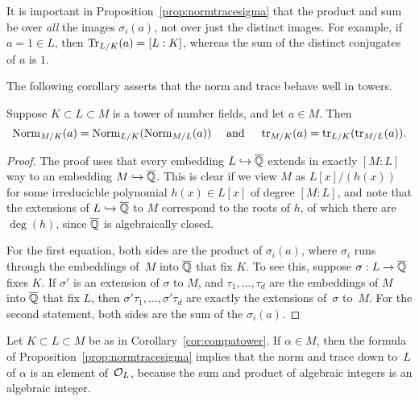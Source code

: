 It is important in Proposition~\ref{prop:normtracesigma} that
the product and sum be over {\em all} the images $\sigma_i(a)$,
not over just the distinct images.  For example, if $a=1\in L$, then
$\operatorname{Tr}_{L/K}(a) = [L:K]$, whereas the sum of the distinct conjugates
of $a$ is $1$.

The following corollary asserts that the norm and trace behave well in
towers.
\begin{corollary}\label{cor:compatower}
Suppose $K\subset L \subset M$ is a tower of number fields, and
let $a\in M$.  Then 
$$
\operatorname{Norm}_{M/K}(a) = \operatorname{Norm}_{L/K}(\operatorname{Norm}_{M/L}(a))
\quad\text{ and }\quad
\operatorname{tr}_{M/K}(a) = \operatorname{tr}_{L/K}(\operatorname{tr}_{M/L}(a)).
$$
\end{corollary}
\begin{proof}
The proof uses that every embedding $L\hookrightarrow \overline{\mathbb{Q}}$ extends in exactly
$[M:L]$ way to an embedding $M\hookrightarrow \overline{\mathbb{Q}}$.  This is clear
if we view $M$ as $L[x]/(h(x))$ for some irreducicble
polynomial $h(x) \in L[x]$ of degree $[M:L]$, and note that 
the extensions of $L\hookrightarrow \overline{\mathbb{Q}}$ to $M$ correspond to
the roots of $h$, of which there are $\deg(h)$, since $\overline{\mathbb{Q}}$
is algebraically closed.

  For the first equation, both sides are the product of $\sigma_i(a)$,
  where $\sigma_i$ runs through the embeddings of~$M$ into $\overline{\mathbb{Q}}$
  that fix $K$.  To see this, suppose $\sigma:L\to \overline{\mathbb{Q}}$ fixes $K$.
  If $\sigma'$ is an extension of $\sigma$ to $M$, and $\tau_1,\ldots,
  \tau_d$ are the embeddings of $M$ into $\overline{\mathbb{Q}}$ that fix $L$, then
  $\sigma'\tau_1,\ldots,\sigma'\tau_d$ are exactly the extensions
  of~$\sigma$ to~$M$.  For the second statement, both sides are the
  sum of the $\sigma_i(a)$.
\end{proof}

Let $K\subset L\subset M$ be as in Corollary~\ref{cor:compatower}.  If
$\alpha\in M$, then the formula of
Proposition~\ref{prop:normtracesigma} implies that the norm and trace
down to~$L$ of $\alpha$ is an element of~$\mathcal{O}_L$, because the sum and
product of algebraic integers is an algebraic integer.

